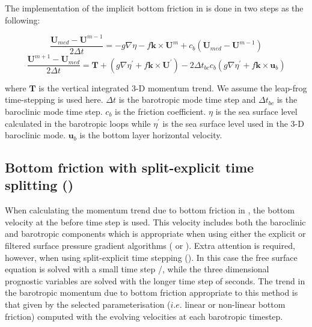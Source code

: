 \documentclass[../tex_main/NEMO_manual]{subfiles}
\begin{document}
The implementation of the implicit bottom friction in  is done in two steps as the following:

\begin{equation} \label{eq:dynspg_ts_bfr1}
\frac{\textbf{U}_{med}-\textbf{U}^{m-1}}{2\Delta t}=-g\nabla\eta-f\textbf{k}\times\textbf{U}^{m}+c_{b}
\left(\textbf{U}_{med}-\textbf{U}^{m-1}\right)
\end{equation}
\begin{equation} \label{eq:dynspg_ts_bfr2}
\frac{\textbf{U}^{m+1}-\textbf{U}_{med}}{2\Delta t}=\textbf{T}+
\left(g\nabla\eta^{'}+f\textbf{k}\times\textbf{U}^{'}\right)-
2\Delta t_{bc}c_{b}\left(g\nabla\eta^{'}+f\textbf{k}\times\textbf{u}_{b}\right)
\end{equation}

where $\textbf{T}$ is the vertical integrated 3-D momentum trend.
We assume the leap-frog time-stepping is used here.
$\Delta t$ is the barotropic mode time step and $\Delta t_{bc}$ is the baroclinic mode time step.
$c_{b}$ is the friction coefficient.
$\eta$ is the sea surface level calculated in the barotropic loops while $\eta^{'}$ is the sea surface level used in
the 3-D baroclinic mode.
$\textbf{u}_{b}$ is the bottom layer horizontal velocity.




\subsection[Bottom friction w/ split-explicit time splitting (\protect\np{ln\_bfrimp})]
				{Bottom friction with split-explicit time splitting (\protect{})}
\label{subsec:ZDF_bfr_ts}

When calculating the momentum trend due to bottom friction in ,
the bottom velocity at the before time step is used.
This velocity includes both the baroclinic and barotropic components which is appropriate when
using either the explicit or filtered surface pressure gradient algorithms
( or ).
Extra attention is required, however, when using split-explicit time stepping ().
In this case the free surface equation is solved with a small time step /,
while the three dimensional prognostic variables are solved with the longer time step of  seconds.
The trend in the barotropic momentum due to bottom friction appropriate to this method is that given by
the selected parameterisation ($i.e.$ linear or non-linear bottom friction) computed with
the evolving velocities at each barotropic timestep. 
\end{document}
